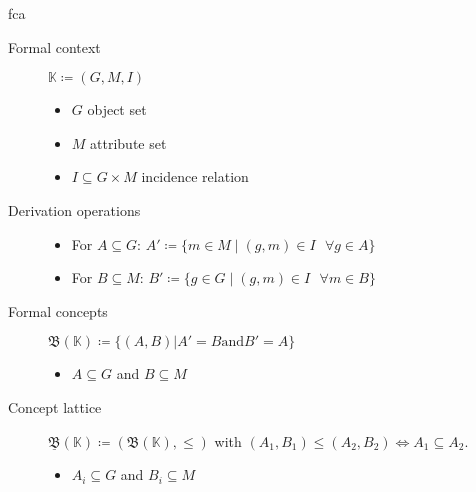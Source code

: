 \begin{frame}{\acf{fca}} %
    
\begin{description}
    \item[Formal context] $\mathbb{K} \coloneq (G, M, I)$
    \begin{itemize}
        \item $G$ object set
        \item $M$ attribute set
        \item $I \subseteq G \times M$ incidence relation
    \end{itemize}
\item [Derivation operations] \text{ }
\begin{itemize}
    \item For $A \subseteq G $: $A' \coloneq \{m \in M \mid (g, m) \in I \text{ } \forall g \in A \}$
    \item For $B \subseteq M $: $B' \coloneq \{g \in G \mid (g, m) \in I \text{ } \forall m \in B\}$
\end{itemize}
\item [Formal concepts] $\mathfrak{B}(\mathbb{K}) \coloneq \{(A,B) | A' = B \text{and} B' = A \}$ 
\begin{itemize}
    \item $A \subseteq G$ and $B \subseteq M$
\end{itemize} 
\item [Concept lattice] $\underline{\mathfrak{B}}(\mathbb{K}) \coloneq (\mathfrak{B}(\mathbb{K}), \leq)$ with $(A_1, B_1) \leq (A_2, B_2) \iff A_1 \subseteq A_2$.
\begin{itemize}
    \item $A_i \subseteq G$ and $B_i \subseteq M$
\end{itemize} 
\end{description}
\end{frame}
